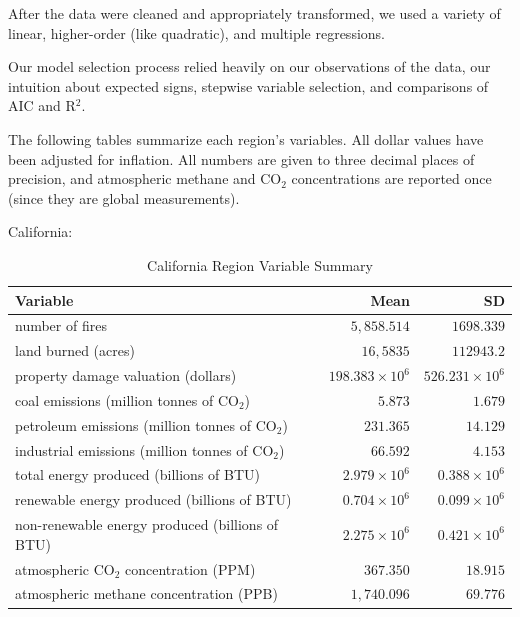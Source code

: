 \documentclass[10pt,]{article}
\begin{document}
After the data were cleaned and appropriately transformed, we used a
variety of linear, higher-order (like quadratic), and multiple
regressions.

Our model selection process relied heavily on our observations of the
data, our intuition about expected signs, stepwise variable selection,
and comparisons of AIC and R\(^2\).

\newpage

The following tables summarize each region's variables. All dollar
values have been adjusted for inflation. All numbers are given to three
decimal places of precision, and atmospheric methane and CO\(_2\)
concentrations are reported once (since they are global measurements).

California:

\begin{center}
  \begin{table}[h]
  \caption{\label{tab:table-name}California Region Variable Summary}
  \smallskip
  \begin{center}
  \begin{tabular}{|l r r|}
  \hline
  Variable & Mean & SD \\ [0.5ex] 
  \hline\hline
  number of fires & $5,858.514$ & $1698.339$ \\ 
  \hline
  land burned (acres) & $16,5835$ & $112943.2$ \\
  \hline
  property damage valuation (dollars) & $198.383 \times 10^6$ & $526.231 \times 10^6$ \\
  \hline
  coal emissions (million tonnes of CO$_2$) & $5.873$ & $1.679$ \\
  \hline
  petroleum emissions (million tonnes of CO$_2$) & $231.365$ & $14.129$ \\
  \hline
  industrial emissions (million tonnes of CO$_2$) & $66.592$ & $4.153$ \\ 
  \hline
  total energy produced (billions of BTU) & $2.979 \times 10^6$ & $0.388 \times 10^6$ \\
  \hline
  renewable energy produced (billions of BTU) & $0.704 \times 10^6$ & $0.099 \times 10^6$ \\
  \hline
  non-renewable energy produced (billions of BTU) & $2.275 \times 10^6$ & $0.421 \times 10^6$ \\
  \hline
  atmospheric CO$_2$ concentration (PPM) & $367.350$ & $18.915$ \\
  \hline
  atmospheric methane concentration (PPB) & $1,740.096$ & $69.776$ \\ [1ex] 
  \hline
  \end{tabular}
  \end{center}
  \end{table}
\end{center}
\end{document}
